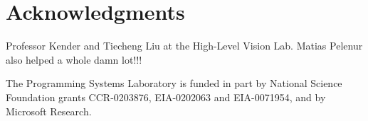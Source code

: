 \documentclass{sig-alternate}
\begin{document}
\section{Acknowledgments}
Professor Kender and Tiecheng Liu at the High-Level Vision Lab.
Matias Pelenur also helped a whole damn lot!!!

The Programming Systems Laboratory is funded in part by National
Science Foundation grants CCR-0203876, EIA-0202063 and EIA-0071954,
and by Microsoft Research.


 

% 


\balancecolumns %
\end{document}
